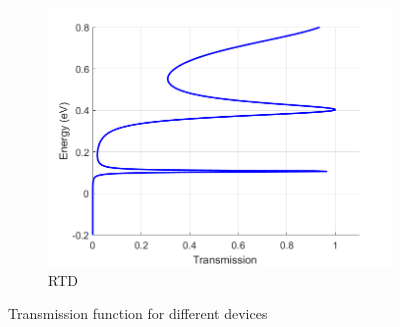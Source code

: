 \documentclass{beamer}
\begin{document}
{\begin{frame}
\begin{figure}
\begin{subfigure}{0.3\textwidth}
     \includegraphics[width=\linewidth]{T_rtd.png}
     \caption{\scriptsize RTD}
  \end{subfigure}
  \caption{\scriptsize Transmission function for different devices}
\end{figure}
          
    \end{frame} 
} 
\end{document}
